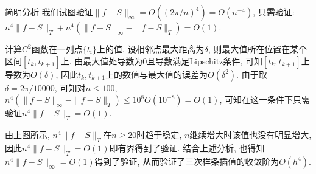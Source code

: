 \documentclass{article}
\begin{document}
\begin{section}{简明分析}
    我们试图验证$\|f-S\|_{\infty}=O((2\pi/n)^4)=O(n^{-4})$, 
    只需验证: 
    $n^4\|f-S\|_T + n^4(\|f-S\|_{\infty}-\|f-S\|_T)=O(1)$. 
        
    计算$C^2$函数在一列点$\{t_i\}$上的值, 设相邻点最大距离为$\delta$, 则最大值所在位置在某个区间$[t_k,t_{k+1}]$上. 由最大值处导数为0且导数满足Lipschitz条件, 可知$[t_k,t_{k+1}]$上导数为$O(\delta)$, 因此$t_k,t_{k+1}$上的数值与最大值的误差为$O(\delta^2)$. 由于取$\delta = 2\pi/10000$, 
    可知对$n\leq 100$, $n^4(\|f-S\|_{\infty}-\|f-S\|_T)\leq 10^8O(10^{-8})=O(1)$, 可知在这一条件下只需验证$n^4\|f-S\|_T=O(1)$. 

    由上图所示, $n^4\|f-S\|_T$在$n\geq 20$时趋于稳定, $n$继续增大时该值也没有明显增大, 因此$n^4\|f-S\|_T=O(1)$即有界得到了验证. 结合上述分析, 也得知$n^4\|f-S\|_{\infty}=O(1)$得到了验证, 
    从而验证了三次样条插值的收敛阶为$O(h^4)$.
    

\end{section}
\end{document}
